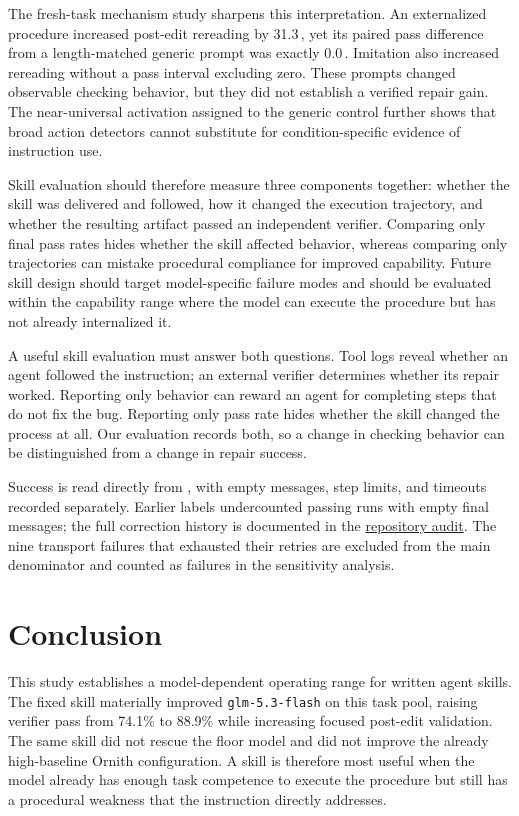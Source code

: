 \documentclass[10pt]{article}
\newcommand{\pp}{\,\text{pp}}
\newcommand{\GLM}{\texttt{glm-5.3-flash}}
\begin{document}
The fresh-task mechanism study sharpens this interpretation. An externalized procedure increased post-edit rereading by 31.3\pp{}, yet its paired pass difference from a length-matched generic prompt was exactly 0.0\pp{}. Imitation also increased rereading without a pass interval excluding zero. These prompts changed observable checking behavior, but they did not establish a verified repair gain. The near-universal activation assigned to the generic control further shows that broad action detectors cannot substitute for condition-specific evidence of instruction use.

Skill evaluation should therefore measure three components together: whether the skill was delivered and followed, how it changed the execution trajectory, and whether the resulting artifact passed an independent verifier. Comparing only final pass rates hides whether the skill affected behavior, whereas comparing only trajectories can mistake procedural compliance for improved capability. Future skill design should target model-specific failure modes and should be evaluated within the capability range where the model can execute the procedure but has not already internalized it.

A useful skill evaluation must answer both questions. Tool logs reveal whether an agent followed the instruction; an external verifier determines whether its repair worked. Reporting only behavior can reward an agent for completing steps that do not fix the bug. Reporting only pass rate hides whether the skill changed the process at all. Our evaluation records both, so a change in checking behavior can be distinguished from a change in repair success.

Success is read directly from , with empty messages, step limits, and timeouts recorded separately. Earlier labels undercounted passing runs with empty final messages; the full correction history is documented in the \href{https://github.com/77chenchen/cross-model-analysis-and-optimization-of-agent-skills/blob/main/docs/verifier_pass_erratum_20261010.md}{repository audit}. The nine transport failures that exhausted their retries are excluded from the main denominator and counted as failures in the sensitivity analysis.

\section{Conclusion}

This study establishes a model-dependent operating range for written agent skills. The fixed skill materially improved \GLM{} on this task pool, raising verifier pass from 74.1\% to 88.9\% while increasing focused post-edit validation. The same skill did not rescue the floor model and did not improve the already high-baseline Ornith configuration. A skill is therefore most useful when the model already has enough task competence to execute the procedure but still has a procedural weakness that the instruction directly addresses.
\end{document}
